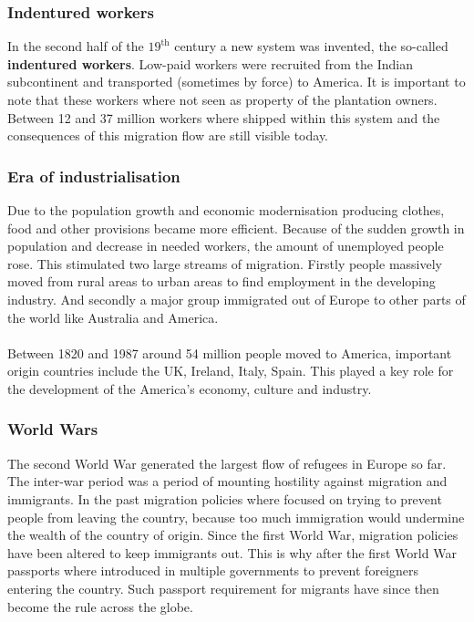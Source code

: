 \documentclass[../summary.tex]{subfiles}
\begin{document}
\subsubsection{Indentured workers}
In the second half of the $\mathrm{19^{th}}$ century a new system was invented, the so-called \textbf{indentured workers}. Low-paid workers were recruited from the Indian subcontinent and transported (sometimes by force) to America. It is important to note that these workers where not seen as property of the plantation owners. Between 12 and 37 million workers where shipped within this system and the consequences of this migration flow are still visible today.

\subsubsection{Era of industrialisation}
Due to the population growth and economic modernisation producing clothes, food and other provisions became more efficient. Because of the sudden growth in population and decrease in needed workers, the amount of unemployed people rose. This stimulated two large streams of migration. Firstly people massively moved from rural areas to urban areas to find employment in the developing industry. And secondly a major group immigrated out of Europe to other parts of the world like Australia and America.
\\\\
Between 1820 and 1987 around 54 million people moved to America, important origin countries include the UK, Ireland, Italy, Spain. This played a key role for the development of the America's economy, culture and industry.
\newpage

\subsubsection{World Wars}
The second World War generated the largest flow of refugees in Europe so far. The inter-war period was a period of mounting hostility against migration and immigrants. In the past migration policies where focused on trying to prevent people from leaving the country, because too much immigration would undermine the wealth of the country of origin. Since the first World War, migration policies have been altered to keep immigrants out. This is why after the first World War passports where introduced in multiple governments to prevent foreigners entering the country. Such passport requirement for migrants have since then become the rule across the globe.
\end{document}

